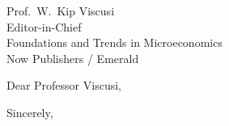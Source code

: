 \documentclass[11pt,a4paper]{letter}
\begin{document}
\begin{letter}{Prof.\ W.\ Kip Viscusi \\ Editor-in-Chief \\ Foundations and Trends in Microeconomics \\ Now Publishers / Emerald}

\opening{Dear Professor Viscusi,}


\closing{Sincerely,}

\end{letter}
\end{document}
